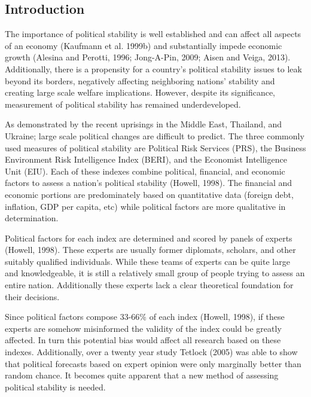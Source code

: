 \documentclass[12pt]{article}
\begin{document}
\begin{spacing}{1.5}

\section*{Introduction}

The importance of political stability is well established and can affect all aspects of an economy (Kaufmann et al. 1999b) and substantially impede economic growth (Alesina and Perotti, 1996; Jong-A-Pin, 2009; Aisen and Veiga, 2013). Additionally, there is a propensity for a country's political stability issues to leak beyond its borders, negatively affecting neighboring nations' stability and creating large scale welfare implications. However, despite its significance, measurement of political stability has remained underdeveloped. 

As demonstrated by the recent uprisings in the Middle East, Thailand, and Ukraine; large scale political changes are difficult to predict. The three commonly used measures of political stability are Political Risk Services (PRS), the Business Environment Risk Intelligence Index (BERI), and the Economist Intelligence Unit (EIU). Each of these indexes combine political, financial, and economic factors to assess a nation's political stability (Howell, 1998). The financial and economic portions are predominately based on quantitative data (foreign debt, inflation, GDP per capita, etc) while political factors are more qualitative in determination. 

Political factors for each index are determined and scored by panels of experts (Howell, 1998). These experts are usually former diplomats, scholars, and other suitably qualified individuals. While these teams of experts can be quite large and knowledgeable, it is still a relatively small group of people trying to assess an entire nation. Additionally these experts lack a clear theoretical foundation for their decisions. 

Since political factors compose 33-66\% of each index (Howell, 1998), if these experts are somehow misinformed the validity of the index could be greatly affected. In turn this potential bias would affect all research based on these indexes. Additionally, over a twenty year study Tetlock (2005) was able to show that political forecasts based on expert opinion were only marginally better than random chance. It becomes quite apparent that a new method of assessing political stability is needed.  


\end{spacing}
\end{document}
